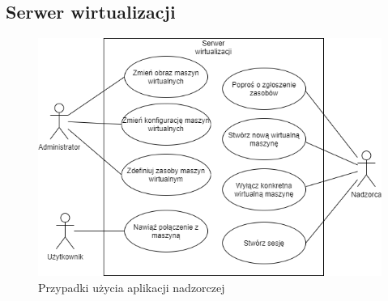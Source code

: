 \documentclass[../praca-dyplomowa.tex]{subfiles}
\begin{document}
\subsection{Serwer wirtualizacji}

\begin{figure}[H]
    \centering
    \includegraphics[width=\textwidth]{../diagrams/use_cases/virtualisation_server.png}
    \caption{Przypadki użycia aplikacji nadzorczej}
\end{figure}
\end{document}
